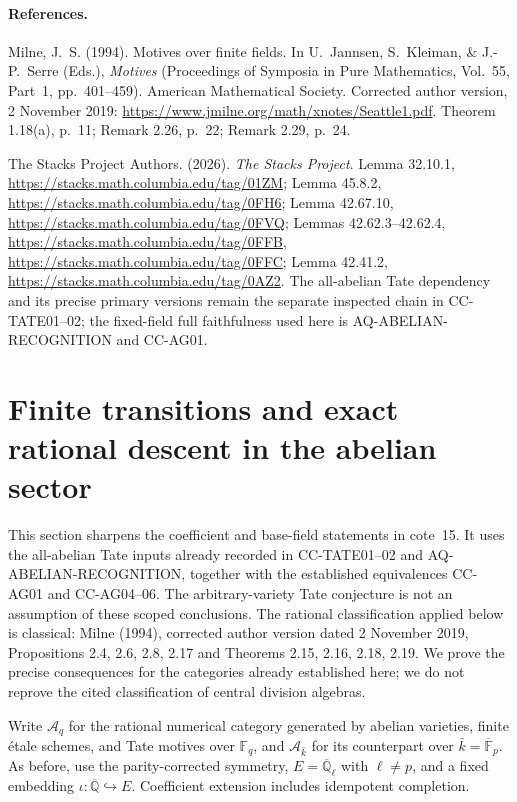 \documentclass[11pt,a4paper]{article}
\theoremstyle{definition}\newtheorem{definition}[theorem]{Definition}
\theoremstyle{remark}\newtheorem{remark}[theorem]{Remark}
\begin{document}
\paragraph{References.}
Milne, J.~S. (1994). Motives over finite fields. In U.~Jannsen,
S.~Kleiman, \& J.-P.~Serre (Eds.), \emph{Motives}
(Proceedings of Symposia in Pure Mathematics, Vol.~55, Part~1,
pp.~401--459). American Mathematical Society.
Corrected author version, 2 November 2019:
\url{https://www.jmilne.org/math/xnotes/Seattle1.pdf}.
Theorem 1.18(a), p.~11; Remark 2.26, p.~22; Remark 2.29, p.~24.

The Stacks Project Authors. (2026). \emph{The Stacks Project}.
Lemma 32.10.1, \url{https://stacks.math.columbia.edu/tag/01ZM};
Lemma 45.8.2, \url{https://stacks.math.columbia.edu/tag/0FH6};
Lemma 42.67.10, \url{https://stacks.math.columbia.edu/tag/0FVQ};
Lemmas 42.62.3--42.62.4,
\url{https://stacks.math.columbia.edu/tag/0FFB},
\url{https://stacks.math.columbia.edu/tag/0FFC};
Lemma 42.41.2, \url{https://stacks.math.columbia.edu/tag/0AZ2}.
The all-abelian Tate dependency and its precise primary versions
remain the separate inspected chain in CC-TATE01--02;
the fixed-field full faithfulness used here is AQ-ABELIAN-RECOGNITION
and CC-AG01.


\section{Finite transitions and exact rational descent in the abelian sector}

This section sharpens the coefficient and base-field statements in
cote~15.  It uses the all-abelian Tate inputs already recorded in
CC-TATE01--02 and AQ-ABELIAN-RECOGNITION, together with the established
equivalences CC-AG01 and CC-AG04--06.  The arbitrary-variety Tate
conjecture is not an assumption of these scoped conclusions.  The
rational classification applied below is classical: Milne (1994),
corrected author version dated 2 November 2019, Propositions 2.4,
2.6, 2.8, 2.17 and Theorems 2.15, 2.16, 2.18, 2.19.
We prove the precise
consequences for the categories already established here; we do not
reprove the cited classification of central division algebras.

Write \(\mathcal A_q\) for the rational numerical category generated
by abelian varieties, finite \'{e}tale schemes, and Tate motives over
\(\mathbb F_q\), and \(\mathcal A_{\bar k}\) for its counterpart over
\(\bar k=\overline{\mathbb F}_p\).  As before, use the
parity-corrected symmetry, \(E=\overline{\mathbb Q}_\ell\) with
\(\ell\ne p\), and a fixed embedding
\(\iota:\overline{\mathbb Q}\hookrightarrow E\).
Coefficient extension includes idempotent completion.
\end{document}
